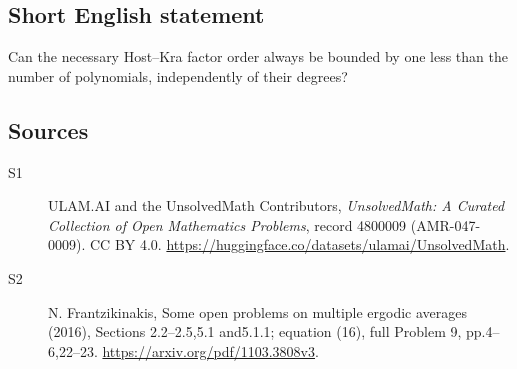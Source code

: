 \documentclass[11pt]{article}
\begin{document}
\subsection{Short English statement}
Can the necessary Host--Kra factor order always be bounded by one less than the number of polynomials, independently of their degrees?
\subsection{Sources}
\begin{description}
\item[\hypertarget{source:4800009:1}{S1}] ULAM.AI and the UnsolvedMath Contributors, \emph{UnsolvedMath: A Curated Collection of Open Mathematics Problems}, record 4800009 (AMR-047-0009). CC BY 4.0. \url{https://huggingface.co/datasets/ulamai/UnsolvedMath}.
\item[\hypertarget{source:4800009:2}{S2}] N. Frantzikinakis, Some open problems on multiple ergodic averages (2016), Sections 2.2--2.5,5.1 and5.1.1; equation (16), full Problem 9, pp.4--6,22--23. \url{https://arxiv.org/pdf/1103.3808v3}.
\end{description}
\label{end:4800009}
\end{document}
